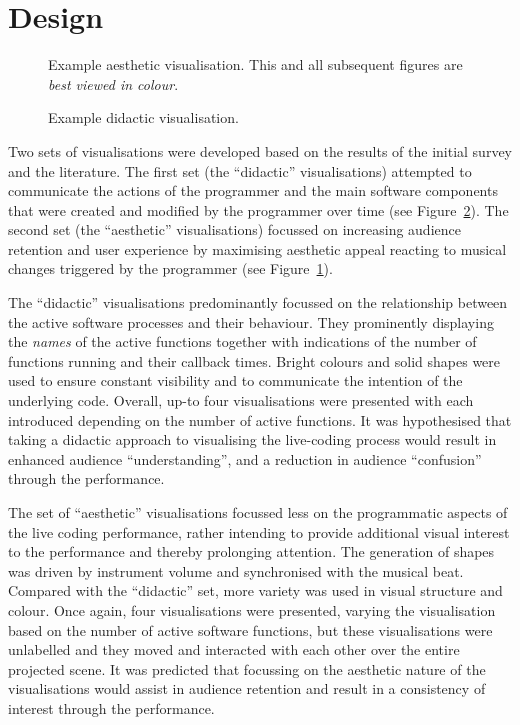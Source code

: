 \documentclass{sig-alternate}
\begin{document}
\section{Design}

\begin{figure}
\centering
{}
\caption{Example aesthetic visualisation. This and all subsequent figures are \textit{best viewed in colour}.}
\label{fig:aesthetic-visualisation}
\end{figure}

\begin{figure}
\centering
{}
\caption{Example didactic visualisation.}
\label{fig:didactic-visualisation}
\end{figure}

Two sets of visualisations were developed based on the results of the
initial survey and the literature. The first set (the ``didactic''
visualisations) attempted to communicate the actions of the programmer
and the main software components that were created and modified by the
programmer over time (see Figure~\ref{fig:didactic-visualisation}).
The second set (the ``aesthetic'' visualisations) focussed on
increasing audience retention and user experience by maximising
aesthetic appeal \cite{Cawthon2007} reacting to musical changes
triggered by the programmer (see
Figure~\ref{fig:aesthetic-visualisation}).

The ``didactic'' visualisations predominantly focussed on the
relationship between the active software processes and their
behaviour. They prominently displaying the \textit{names} of the
active functions together with indications of the number of functions
running and their callback times. Bright colours and solid shapes were
used to ensure constant visibility and to communicate the intention of
the underlying code. Overall, up-to four visualisations were presented
with each introduced depending on the number of active functions. It
was hypothesised that taking a didactic approach to visualising the
live-coding process would result in enhanced audience
``understanding'', and a reduction in audience ``confusion'' through
the performance.

The set of ``aesthetic'' visualisations focussed less on the
programmatic aspects of the live coding performance, rather intending
to provide additional visual interest to the performance and thereby
prolonging attention. The generation of shapes was driven by
instrument volume and synchronised with the musical beat. Compared
with the ``didactic'' set, more variety was used in visual structure
and colour. Once again, four visualisations were presented, varying
the visualisation based on the number of active software functions,
but these visualisations were unlabelled and they moved and interacted
with each other over the entire projected scene. It was predicted that
focussing on the aesthetic nature of the visualisations would assist
in audience retention and result in a consistency of interest through
the performance.
\end{document}
